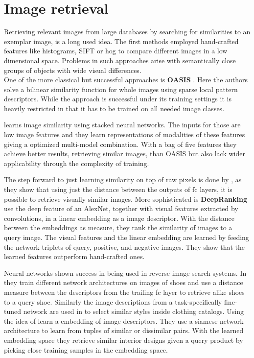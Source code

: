 \section{Image retrieval}
\label{sec:related:retrieval}
Retrieving relevant images from large databases by searching for similarities to an exemplar image, is a long used idea. The first methods employed hand-crafted features like histograms, SIFT or \gls{hog} to compare different images in a low dimensional space. Problems in such approaches arise with semantically close groups of objects with wide visual differences.\\
One of the more classical but successful approaches is \textbf{OASIS} \citep{chechik_large_2010}. Here the authors solve a bilinear similarity function for whole images using sparse local pattern descriptors. While the approach is successful under its training settings it is heavily restricted in that it has to be trained on all needed image classes.

\citet{wu_online_2013} learns image similarity using stacked neural networks. The inputs for those are low image features and they learn representations of modalities of these features giving a optimized multi-model combination. With a bag of five features they achieve better results, retrieving similar images, than OASIS but also lack wider applicability through the complexity of training.

The step forward to just learning similarity on top of raw pixels is done by \citet{babenko_neural_2014}, as they show that using just the distance between  the outputs of \gls{fc} layers, it is possible to retrieve visually similar images. More sophisticated is \textbf{DeepRanking} \citep{wang_learning_2014} use the deep feature of an AlexNet, together with visual features extracted by convolutions, in a linear embedding as a image descriptor. With the distance between the embeddings as measure, they rank the similarity of images to a query image. The visual features and the linear embedding are learned by feeding the network triplets of query, positive, and negative images. They show that the learned features outperform hand-crafted ones.

Neural networks shown success in being used in reverse image search systems. In \citep{khosla_building_2015} they train different network architectures on images of shoes and use a distance measure between the descriptors from the trailing \gls{fc} layer to retrieve alike shoes to a query shoe. Similarly the image descriptions from a task-specifically fine-tuned network are used in \citep{chen_visual-based_2015} to select similar styles inside clothing catalogs. Using the idea of \citep{wang_learning_2014} \citet{bell_learning_2015} learn a embedding of image descriptors. They use a siamese network architecture to learn from tuples of similar or dissimilar pairs. With the learned embedding space they retrieve similar interior designs given a query product by picking close training samples in the embedding space.
